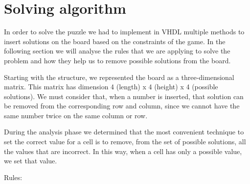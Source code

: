 \documentclass[12pt]{report}
\begin{document}
\chapter*{Solving algorithm}

In order to solve the puzzle we had to implement in VHDL multiple methods
to insert solutions on the board based on the constraints of the game. In
the following section we will analyse the rules that we are applying to
solve the problem and how they help us to remove possible solutions from
the board.

Starting with the structure, we represented the board as
a three-dimensional matrix. This matrix has dimension 4 (length)
x 4 (height) x 4 (possible solutions). We must consider that, when
a number is inserted, that solution can be removed from the corresponding
row and column, since we cannot have the same number twice on the same
column or row.

During the analysis phase we determined that the most convenient technique
to set the correct value for a cell is to remove, from the set of possible
solutions, all the values that are incorrect. In this way, when a cell has
only a possible value, we set that value.

Rules:
\end{document}

